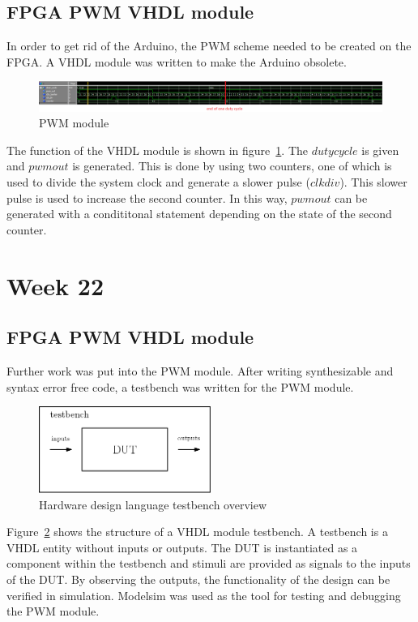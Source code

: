 \subsection{\acs{FPGA} \acs{PWM} VHDL module}
In order to get rid of the Arduino, the \ac{PWM} scheme needed to be created on the \ac{FPGA}. A VHDL module was written to make the Arduino obsolete.
\begin{figure}[!htb]
	\centering
		\includegraphics[width=\textwidth]{bilder/pwm_modelsim.png}
		\caption{\acs{PWM} module}
		\label{fig:modelsim}
\end{figure}
The function of the VHDL module is shown in figure~\ref{fig:modelsim}. The $duty cycle$ is given and $pwm out$ is generated. This is done by using two counters, one of which is used to divide the system clock and generate a slower pulse ($clk div$). This slower pulse is used to increase the second counter. In this way, $pwm out$ can be generated with a condititonal statement depending on the state of the second counter.

\section{Week 22}
\subsection{\acs{FPGA} \acs{PWM} VHDL module}
Further work was put into the \ac{PWM} module. After writing synthesizable and syntax error free code, a testbench was written for the \ac{PWM} module.
\begin{figure}[!htb]
	\centering
		\includegraphics[width=0.5\textwidth]{bilder/testbench.png}
		\caption{Hardware design language testbench overview}
		\label{fig:testbench}
\end{figure}
Figure~\ref{fig:testbench} shows the structure of a VHDL module testbench. A testbench is a VHDL entity without inputs or outputs. The \ac{DUT} is instantiated as a component within the testbench and stimuli are provided as signals to the inputs of the \ac{DUT}. By observing the outputs, the functionality of the design can be verified in simulation. Modelsim was used as the tool for testing and debugging the \ac{PWM} module.
